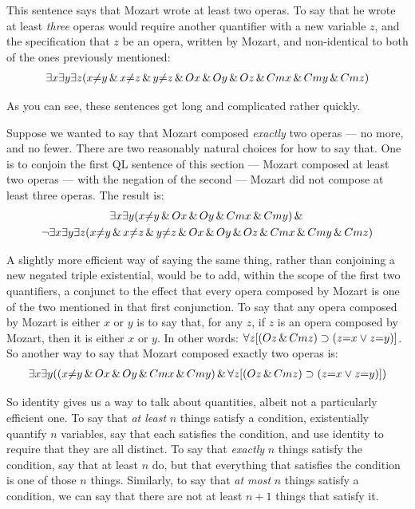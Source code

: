 This sentence says that Mozart wrote at least two operas. To say that he wrote at least \emph{three} operas would require another quantifier with a new variable $z$, and the specification that $z$ be an opera, written by Mozart, and non-identical to both of the ones previously mentioned:
\begin{multline*}
\exists x \exists y \exists z (x {\neq} y \,\&\, x {\neq} z \,\&\, y {\neq} z \,\&\, 
Ox \,\&\, Oy \,\&\, Oz \,\&\, Cmx \,\&\, Cmy \,\&\, Cmz)
\end{multline*}

As you can see, these sentences get long and complicated rather quickly.

Suppose we wanted to say that Mozart composed \emph{exactly} two operas --- no more, and no fewer. There are two reasonably natural choices for how to say that. One is to conjoin the first QL sentence of this section --- Mozart composed at least two operas --- with the negation of the second --- Mozart did not compose at least three operas. The result is:
\begin{multline*}
\exists x \exists y (x {\neq} y \,\&\, Ox \,\&\, Oy \,\&\, Cmx \,\&\, Cmy) \,\&\, \\ \neg \exists x \exists y \exists z (x {\neq} y \,\&\, x {\neq} z \,\&\, y {\neq} z \,\&\, Ox \,\&\, Oy \,\&\, Oz \,\&\, Cmx \,\&\, Cmy \,\&\, Cmz)
\end{multline*}

A slightly more efficient way of saying the same thing, rather than conjoining a new negated triple existential, would be to add, within the scope of the first two quantifiers, a conjunct to the effect that every opera composed by Mozart is one of the two mentioned in that first conjunction. To say that any opera composed by Mozart is either $x$ or $y$ is to say that, for any $z$, if $z$ is an opera composed by Mozart, then it is either $x$ or $y$. In other words: $\forall z [(Oz \,\&\, Cmz) \supset (z{=}x \vee z{=}y)]$. So another way to say that Mozart composed exactly two operas is:
\begin{multline*}
\exists x \exists y ((x {\neq} y  \,\&\,  Ox \,\&\, Oy \,\&\,  Cmx \,\&\, Cmy) \,\&\, \forall z [(Oz \,\&\, Cmz) \supset (z{=}x \vee z{=}y)])
\end{multline*}

So identity gives us a way to talk about quantities, albeit not a particularly efficient one. To say that \emph{at least} $n$ things satisfy a condition, existentially quantify $n$ variables, say that each satisfies the condition, and use identity to require that they are all distinct. To say that \emph{exactly} $n$ things satisfy the condition, say that at least $n$ do, but that everything that satisfies the condition is one of those $n$ things. Similarly, to say that \emph{at most} $n$ things satisfy a condition, we can say that there are not at least $n+1$ things that satisfy it.



